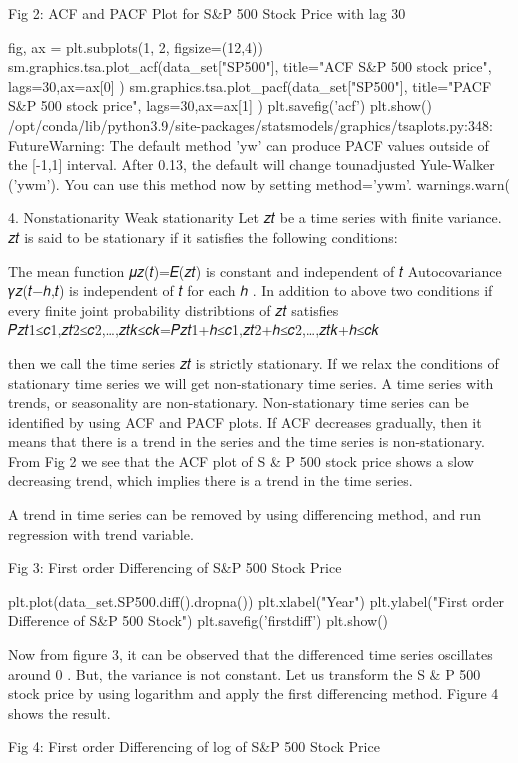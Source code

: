 Fig 2: ACF and PACF Plot for S&P 500 Stock Price with lag 30

fig, ax = plt.subplots(1, 2, figsize=(12,4))
sm.graphics.tsa.plot_acf(data_set["SP500"], title="ACF S&P 500 stock price", lags=30,ax=ax[0] )
sm.graphics.tsa.plot_pacf(data_set["SP500"], title="PACF S&P 500 stock price", lags=30,ax=ax[1] )
plt.savefig('acf')
plt.show()
/opt/conda/lib/python3.9/site-packages/statsmodels/graphics/tsaplots.py:348: FutureWarning: The default method 'yw' can produce PACF values outside of the [-1,1] interval. After 0.13, the default will change tounadjusted Yule-Walker ('ywm'). You can use this method now by setting method='ywm'.
  warnings.warn(

4. Nonstationarity
Weak stationarity
Let  {𝑧𝑡}  be a time series with finite variance.  {𝑧𝑡}  is said to be stationary if it satisfies the following conditions:

The mean function  𝜇𝑧(𝑡)=𝐸(𝑧𝑡)  is constant and independent of  𝑡 
Autocovariance  𝛾𝑧(𝑡−ℎ,𝑡)  is independent of  𝑡  for each  ℎ .
In addition to above two conditions if every finite joint probability distribtions of  {𝑧𝑡}  satisfies
𝑃{𝑧𝑡1≤𝑐1,𝑧𝑡2≤𝑐2,…,𝑧𝑡𝑘≤𝑐𝑘}=𝑃{𝑧𝑡1+ℎ≤𝑐1,𝑧𝑡2+ℎ≤𝑐2,…,𝑧𝑡𝑘+ℎ≤𝑐𝑘}
 
then we call the time series  {𝑧𝑡}  is strictly stationary. If we relax the conditions of stationary time series we will get non-stationary time series.
A time series with trends, or seasonality are non-stationary.
Non-stationary time series can be identified by using ACF and PACF plots. If ACF decreases gradually, then it means that there is a trend in the series and the time series is non-stationary. From Fig 2 we see that the ACF plot of S & P 500 stock price shows a slow decreasing trend, which implies there is a trend in the time series.

A trend in time series can be removed by using differencing method, and run regression with trend variable.

Fig 3: First order Differencing of S&P 500 Stock Price

plt.plot(data_set.SP500.diff().dropna())
plt.xlabel("Year")
plt.ylabel("First order Difference of S&P 500 Stock")
plt.savefig('firstdiff')
plt.show()

Now from figure 3, it can be observed that the differenced time series oscillates around  0 . But, the variance is not constant. Let us transform the S & P 500 stock price by using logarithm and apply the first differencing method. Figure 4 shows the result.

Fig 4: First order Differencing of log of S&P 500 Stock Price


